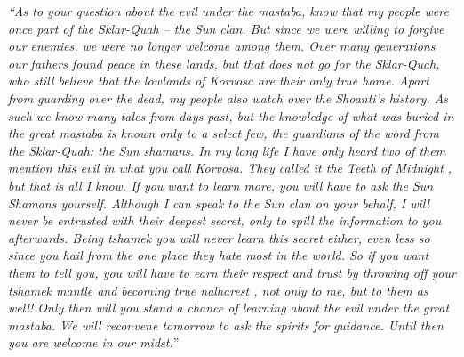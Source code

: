 {\itshape``As to your question about the evil under the mastaba, know that my people were once part of the Sklar-Quah -- the Sun clan. But since we were willing to forgive our enemies, we were no longer welcome among them. Over many generations our fathers found peace in these lands, but that does not go for the Sklar-Quah, who still believe that the lowlands of Korvosa are their only true home. Apart from guarding over the dead, my people also watch over the Shoanti's history. As such we know many tales from days past, but the knowledge of what was buried in the great mastaba is known only to a select few, the guardians of the word from the Sklar-Quah: the Sun shamans. In my long life I have only heard two of them mention this evil in what you call Korvosa. They called it {\itshape the Teeth of Midnight} , but that is all I know. If you want to learn more, you will have to ask the Sun Shamans yourself. Although I can speak to the Sun clan on your behalf, I will never be entrusted with their deepest secret, only to spill the information to you afterwards. Being {\itshape tshamek} you will never learn this secret either, even less so since you hail from the one place they hate most in the world. So if you want them to tell you, you will have to earn their respect and trust by throwing off your  {\itshape tshamek} mantle and becoming true  {\itshape nalharest} , not only to me, but to them as well! Only then will you stand a chance of learning about the evil under the great mastaba. We will reconvene tomorrow to ask the spirits for guidance. Until then you are welcome in our midst.}''\\

